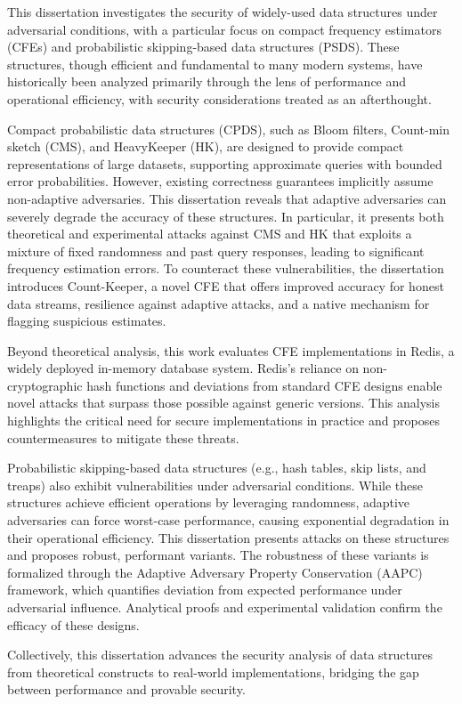 

This dissertation investigates the security of widely-used data structures under adversarial conditions, with a particular focus on compact frequency estimators (CFEs) and probabilistic skipping-based data structures (PSDS). These structures, though efficient and fundamental to many modern systems, have historically been analyzed primarily through the lens of performance and operational efficiency, with security considerations treated as an afterthought.

Compact probabilistic data structures (CPDS), such as Bloom filters, Count-min sketch (CMS), and HeavyKeeper (HK), are designed to provide compact representations of large datasets, supporting approximate queries with bounded error probabilities. However, existing correctness guarantees implicitly assume non-adaptive adversaries. This dissertation reveals that adaptive adversaries can severely degrade the accuracy of these structures. In particular, it presents both theoretical and experimental attacks against CMS and HK that exploits a mixture of fixed randomness and past query responses, leading to significant frequency estimation errors. To counteract these vulnerabilities, the dissertation introduces Count-Keeper, a novel CFE that offers improved accuracy for honest data streams, resilience against adaptive attacks, and a native mechanism for flagging suspicious estimates.

Beyond theoretical analysis, this work evaluates CFE implementations in Redis, a widely deployed in-memory database system. Redis's reliance on non-cryptographic hash functions and deviations from standard CFE designs enable novel attacks that surpass those possible against generic versions. This analysis highlights the critical need for secure implementations in practice and proposes countermeasures to mitigate these threats.

Probabilistic skipping-based data structures (e.g., hash tables, skip lists, and treaps) also exhibit vulnerabilities under adversarial conditions. While these structures achieve efficient operations by leveraging randomness, adaptive adversaries can force worst-case performance, causing exponential degradation in their operational efficiency. This dissertation presents attacks on these structures and proposes robust, performant variants. The robustness of these variants is formalized through the Adaptive Adversary Property Conservation (AAPC) framework, which quantifies deviation from expected performance under adversarial influence. Analytical proofs and experimental validation confirm the efficacy of these designs.

Collectively, this dissertation advances the security analysis of data structures from theoretical constructs to real-world implementations, bridging the gap between performance and provable security. 